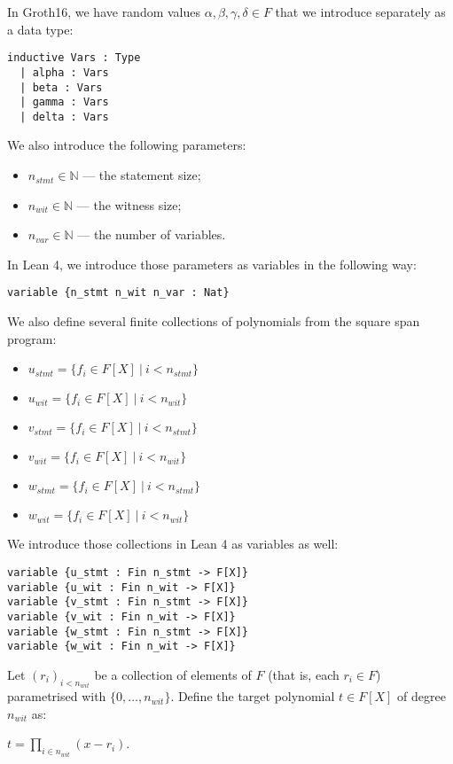 \documentclass{article}
\theoremstyle{definition}
\theoremstyle{remark}
\begin{document}
In Groth16, we have random values $\alpha, \beta, \gamma, \delta \in F$ that we introduce separately as a data type:
\begin{lstlisting}
inductive Vars : Type
  | alpha : Vars
  | beta : Vars
  | gamma : Vars
  | delta : Vars
\end{lstlisting}

We also introduce the following parameters:

\begin{itemize}
\item $n_{stmt} \in \mathbb{N}$ --- the statement size;
\item $n_{wit} \in \mathbb{N}$ --- the witness size;
\item $n_{var} \in \mathbb{N}$ --- the number of variables.
\end{itemize}

In Lean 4, we introduce those parameters as variables in the following way:

\begin{lstlisting}
variable {n_stmt n_wit n_var : Nat}
\end{lstlisting}

We also define several finite collections of polynomials from the square span program:

\begin{itemize}
\item $u_{stmt} = \{ f_{i} \in F[X] \: | \: i < n_{stmt} \}$
\item $u_{wit} = \{ f_{i} \in F[X] \: | \: i < n_{wit} \}$
\item $v_{stmt} = \{ f_{i} \in F[X] \: | \: i < n_{stmt} \}$
\item $v_{wit} = \{ f_{i} \in F[X] \: | \: i < n_{wit} \}$
\item $w_{stmt} = \{ f_{i} \in F[X] \: | \: i < n_{stmt} \}$
\item $w_{wit} = \{ f_{i} \in F[X] \: | \: i < n_{wit} \}$
\end{itemize}

We introduce those collections in Lean 4 as variables as well:

\begin{lstlisting}
variable {u_stmt : Fin n_stmt -> F[X]}
variable {u_wit : Fin n_wit -> F[X]}
variable {v_stmt : Fin n_stmt -> F[X]}
variable {v_wit : Fin n_wit -> F[X]}
variable {w_stmt : Fin n_stmt -> F[X]}
variable {w_wit : Fin n_wit -> F[X]}
\end{lstlisting}

Let $(r_i)_{i < n_{wit}}$ be a collection of elements of $F$ (that is, each $r_i \in F$) parametrised with $\{0, \dots, n_{wit} \}$.
Define the target polynomial $t \in F[X]$ of degree $n_{wit}$ as:
\begin{center}
$t = \prod \limits_{i \in n_{wit}} (x - r_i)$.
\end{center}
\end{document}
